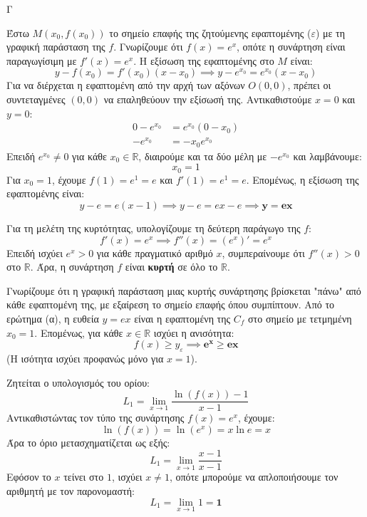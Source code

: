 \begin{thema}{Γ}
\begin{erwthma}
\item Έστω $M(x_0, f(x_0))$ το σημείο επαφής της ζητούμενης εφαπτομένης ($\varepsilon$) με τη γραφική παράσταση της $f$. 
Γνωρίζουμε ότι $f(x) = e^x$, οπότε η συνάρτηση είναι παραγωγίσιμη με $f'(x) = e^x$.
Η εξίσωση της εφαπτομένης στο $M$ είναι:
\[ y - f(x_0) = f'(x_0)(x - x_0) \implies y - e^{x_0} = e^{x_0}(x - x_0) \]
Για να διέρχεται η εφαπτομένη από την αρχή των αξόνων $O(0,0)$, πρέπει οι συντεταγμένες $(0,0)$ να επαληθεύουν την εξίσωσή της. 
Αντικαθιστούμε $x = 0$ και $y = 0$:
\begin{align*}
0 - e^{x_0} &= e^{x_0}(0 - x_0) \\
-e^{x_0} &= -x_0 e^{x_0}
\end{align*}
Επειδή $e^{x_0} \neq 0$ για κάθε $x_0 \in \mathbb{R}$, διαιρούμε και τα δύο μέλη με $-e^{x_0}$ και λαμβάνουμε:
\[ x_0 = 1 \]
Για $x_0 = 1$, έχουμε $f(1) = e^1 = e$ και $f'(1) = e^1 = e$. Επομένως, η εξίσωση της εφαπτομένης είναι:
\[ y - e = e(x - 1) \implies y - e = ex - e \implies \boldsymbol{y = ex} \]

\item Για τη μελέτη της κυρτότητας, υπολογίζουμε τη δεύτερη παράγωγο της $f$:
\[ f'(x) = e^x \implies f''(x) = (e^x)' = e^x \]
Επειδή ισχύει $e^x > 0$ για κάθε πραγματικό αριθμό $x$, συμπεραίνουμε ότι $f''(x) > 0$ στο $\mathbb{R}$.
Άρα, η συνάρτηση $f$ είναι \textbf{κυρτή} σε όλο το $\mathbb{R}$.

Γνωρίζουμε ότι η γραφική παράσταση μιας κυρτής συνάρτησης βρίσκεται "πάνω" από κάθε εφαπτομένη της, με εξαίρεση το σημείο επαφής όπου συμπίπτουν.
Από το ερώτημα (α), η ευθεία $y = ex$ είναι η εφαπτομένη της $C_f$ στο σημείο με τετμημένη $x_0 = 1$.
Επομένως, για κάθε $x \in \mathbb{R}$ ισχύει η ανισότητα:
\[ f(x) \ge y_{\varepsilon} \implies \boldsymbol{e^x \ge ex} \]
(Η ισότητα ισχύει προφανώς μόνο για $x = 1$).

\item Ζητείται ο υπολογισμός του ορίου:
\[ L_1 = \lim_{x \to 1} \frac{\ln(f(x)) - 1}{x - 1} \]
Αντικαθιστώντας τον τύπο της συνάρτησης $f(x) = e^x$, έχουμε:
\[ \ln(f(x)) = \ln(e^x) = x \ln e = x \]
Άρα το όριο μετασχηματίζεται ως εξής:
\[ L_1 = \lim_{x \to 1} \frac{x - 1}{x - 1} \]
Εφόσον το $x$ τείνει στο $1$, ισχύει $x \neq 1$, οπότε μπορούμε να απλοποιήσουμε τον αριθμητή με τον παρονομαστή:
\[ L_1 = \lim_{x \to 1} 1 = \boldsymbol{1} \]


\end{erwthma}
\end{thema}
